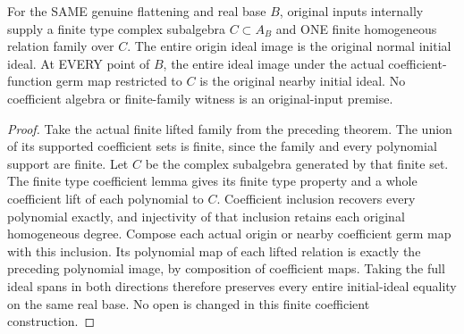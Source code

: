 \begin{theorem}
\label{hir:real-domain-original-finite-type-coefficient-initial-family}
\leanok
For the SAME genuine flattening and real base $B$, original inputs internally
supply a finite type complex subalgebra $C\subset A_B$ and ONE finite homogeneous
relation family over $C$. The entire origin ideal image is the original
normal initial ideal. At EVERY point of $B$, the entire ideal image under the
actual coefficient-function germ map restricted to $C$ is the original
nearby initial ideal. No coefficient algebra or finite-family witness is an
original-input premise.
\end{theorem}
\begin{proof}
Take the actual finite lifted family from the preceding theorem. The union
of its supported coefficient sets is finite, since the family and every
polynomial support are finite. Let $C$ be the complex subalgebra generated by
that finite set. The finite type coefficient lemma gives its finite type
property and a whole coefficient lift of each polynomial to $C$. Coefficient
inclusion recovers every polynomial exactly, and injectivity of that
inclusion retains each original homogeneous degree. Compose each actual
origin or nearby coefficient germ map with this inclusion. Its polynomial
map of each lifted relation is exactly the preceding polynomial image,
by composition of coefficient maps. Taking the full ideal spans in both
directions therefore preserves every entire initial-ideal equality on the
same real base. No open is changed in this finite coefficient construction.
\end{proof}

